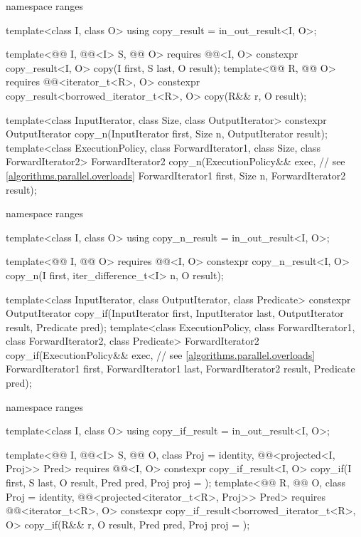 \begin{codeblock}
{  namespace ranges {
    template<class I, class O>
      using copy_result = in_out_result<I, O>;

    template<@@ I, @@<I> S, @@ O>
      requires @@<I, O>
      constexpr copy_result<I, O>
        copy(I first, S last, O result);
    template<@@ R, @@ O>
      requires @@<iterator_t<R>, O>
      constexpr copy_result<borrowed_iterator_t<R>, O>
        copy(R&& r, O result);
  }

  template<class InputIterator, class Size, class OutputIterator>
    constexpr OutputIterator copy_n(InputIterator first, Size n,
                                    OutputIterator result);
  template<class ExecutionPolicy, class ForwardIterator1, class Size,
           class ForwardIterator2>
    ForwardIterator2 copy_n(ExecutionPolicy&& exec,             // see \ref{algorithms.parallel.overloads}
                            ForwardIterator1 first, Size n,
                            ForwardIterator2 result);

  namespace ranges {
    template<class I, class O>
      using copy_n_result = in_out_result<I, O>;

    template<@@ I, @@ O>
      requires @@<I, O>
      constexpr copy_n_result<I, O>
        copy_n(I first, iter_difference_t<I> n, O result);
  }

  template<class InputIterator, class OutputIterator, class Predicate>
    constexpr OutputIterator copy_if(InputIterator first, InputIterator last,
                                     OutputIterator result, Predicate pred);
  template<class ExecutionPolicy, class ForwardIterator1, class ForwardIterator2,
           class Predicate>
    ForwardIterator2 copy_if(ExecutionPolicy&& exec,            // see \ref{algorithms.parallel.overloads}
                             ForwardIterator1 first, ForwardIterator1 last,
                             ForwardIterator2 result, Predicate pred);

  namespace ranges {
    template<class I, class O>
      using copy_if_result = in_out_result<I, O>;

    template<@@ I, @@<I> S, @@ O, class Proj = identity,
             @@<projected<I, Proj>> Pred>
      requires @@<I, O>
      constexpr copy_if_result<I, O>
        copy_if(I first, S last, O result, Pred pred, Proj proj = {});
    template<@@ R, @@ O, class Proj = identity,
             @@<projected<iterator_t<R>, Proj>> Pred>
      requires @@<iterator_t<R>, O>
      constexpr copy_if_result<borrowed_iterator_t<R>, O>
        copy_if(R&& r, O result, Pred pred, Proj proj = {});
  }

}
\end{codeblock}
